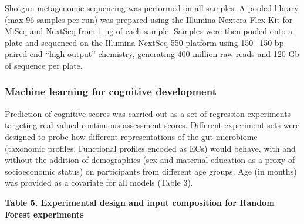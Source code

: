 \documentclass[
]{article}
\begin{document}
Shotgun metagenomic sequencing was performed on all samples. A pooled
library (max 96 samples per run) was prepared using the Illumina Nextera
Flex Kit for MiSeq and NextSeq from 1 ng of each sample. Samples were
then pooled onto a plate and sequenced on the Illumina NextSeq 550
platform using 150+150 bp paired-end ``high output'' chemistry,
generating 400 million raw reads and 120 Gb of sequence per plate.

\hypertarget{machine-learning-for-cognitive-development}{%
\subsubsection{Machine learning for cognitive
development}\label{machine-learning-for-cognitive-development}}

Prediction of cognitive scores was carried out as a set of regression
experiments targeting real-valued continuous assessment scores.
Different experiment sets were designed to probe how different
representations of the gut microbiome (taxonomic profiles, Functional
profiles encoded as ECs) would behave, with and without the addition of
demographics (sex and maternal education as a proxy of socioeconomic
status) on participants from different age groups. Age (in months) was
provided as a covariate for all models (Table 3).

\textbf{Table 5. Experimental design and input composition for Random
Forest experiments}
\end{document}
